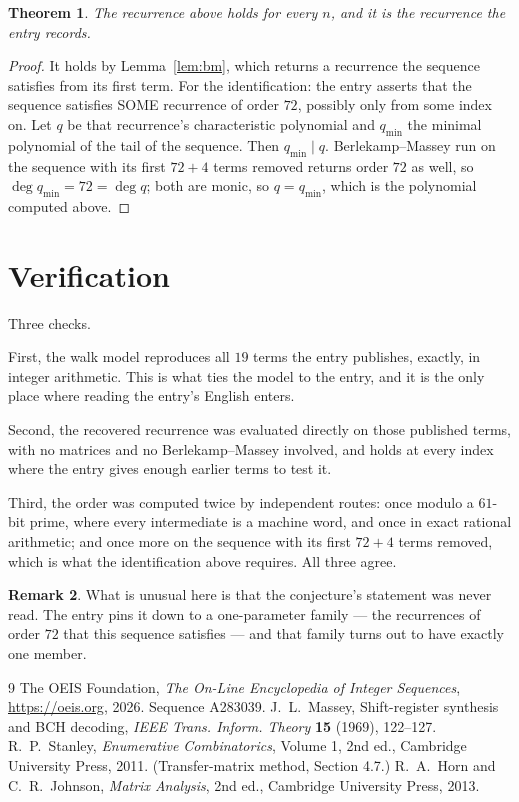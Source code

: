 \documentclass[11pt,a4paper]{article}
\theoremstyle{plain}
\newtheorem{theorem}{Theorem}
\theoremstyle{definition}
\newtheorem{remark}[theorem]{Remark}
\begin{document}
\begin{theorem}
The recurrence above holds for every $n$, and it is the recurrence the entry records.
\end{theorem}

\begin{proof}
It holds by Lemma~\ref{lem:bm}, which returns a recurrence the sequence satisfies from its
first term. For the identification: the entry asserts that the sequence satisfies SOME
recurrence of order $72$, possibly only from some index on. Let $q$ be that recurrence's
characteristic polynomial and $q_{\min}$ the minimal polynomial of the tail of the sequence.
Then $q_{\min}\mid q$. Berlekamp--Massey run on the sequence with its first $72+4$ terms
removed returns order $72$ as well, so $\deg q_{\min}=72=\deg q$; both are monic, so
$q=q_{\min}$, which is the polynomial computed above.
\end{proof}

\section{Verification}

Three checks.

First, the walk model reproduces all $19$ terms the entry publishes, exactly, in integer
arithmetic. This is what ties the model to the entry, and it is the only place where reading
the entry's English enters.

Second, the recovered recurrence was evaluated directly on those published terms, with no
matrices and no Berlekamp--Massey involved, and holds at every index where the entry gives
enough earlier terms to test it.

Third, the order was computed twice by independent routes: once modulo a $61$-bit prime, where
every intermediate is a machine word, and once in exact rational arithmetic; and once more on
the sequence with its first $72+4$ terms removed, which is what the identification above
requires. All three agree.

\begin{remark}
What is unusual here is that the conjecture's statement was never read. The entry pins it down
to a one-parameter family --- the recurrences of order $72$ that this sequence satisfies
--- and that family turns out to have exactly one member.
\end{remark}

\begin{thebibliography}{9}
 The OEIS Foundation, \emph{The On-Line Encyclopedia of Integer
Sequences}, \url{https://oeis.org}, 2026. Sequence A283039.
 J.~L.~Massey, Shift-register synthesis and BCH decoding, \emph{IEEE
Trans. Inform. Theory} \textbf{15} (1969), 122--127.
 R.~P.~Stanley, \emph{Enumerative Combinatorics}, Volume 1, 2nd ed.,
Cambridge University Press, 2011. (Transfer-matrix method, Section 4.7.)
 R.~A.~Horn and C.~R.~Johnson, \emph{Matrix Analysis}, 2nd ed., Cambridge
University Press, 2013.
\end{thebibliography}
\end{document}
